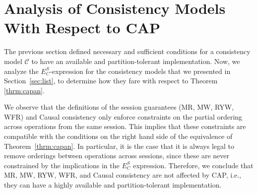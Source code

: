 \documentclass[journal, compsoc]{IEEEtran}
\begin{document}
	\section{Analysis of Consistency Models With Respect to CAP}\label{sec:capanalyze}
	
	The previous section defined necessary and sufficient conditions for
	a consistency model $\mathcal{C}$ to have an available and partition-tolerant
	implementation. Now, we analyze the $E^S_C$-expression for the consistency models that we presented in Section~\ref{sec:list}, to determine how they fare with respect to Theorem \ref{thrm:capan}.
	
	
	We observe that the definitions of the session guarantees (MR, MW, RYW, WFR) and Causal consistency only enforce constraints on the partial ordering across operations from the same session. This implies that these constraints are compatible with the conditions on the right hand side of the equivalence of Theorem~\ref{thrm:capan}. In particular, it is the case that it is always legal to remove orderings between operations across sessions, since these are never constrained by the implications in the $E^S_C$ expression. Therefore, we conclude that MR, MW, RYW, WFR, and  Causal consistency are not affected by CAP, i.e., they can have a highly available and partition-tolerant implementation.
	
\end{document}
